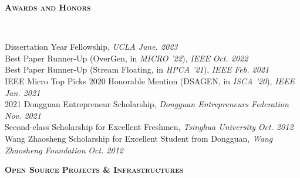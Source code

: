 \documentclass[a4paper]{article}
\newenvironment{changemargin}[2]{%
  \begin{list}{}{%
    \setlength{\topsep}{0pt}%
    \setlength{\leftmargin}{#1}%
    \setlength{\rightmargin}{#2}%
    \setlength{\listparindent}{\parindent}%
    \setlength{\itemindent}{\parindent}%
    \setlength{\parsep}{\parskip}%
  }%
  \item[]}{\end{list}
}
\newcommand{\lineover}{
	\begin{changemargin}{-0.05in}{-0.05in}
		\vspace*{-8pt}
		\hrulefill \\
		\vspace*{-2pt}
	\end{changemargin}
}
\newcommand{\header}[1]{
	\begin{changemargin}{-0.5in}{-0.5in}
		\scshape{\large \textbf{#1}}\\
  	\lineover
	\end{changemargin}
}
\newenvironment{body} {
	\vspace*{-16pt}
	\begin{changemargin}{-0.5in}{-0.5in}
  }	
	{\end{changemargin}
}
\begin{document}
\header{Awards and Honors}

\begin{body}
	\vspace{14pt}
	Dissertation Year Fellowship, \emph{UCLA} \hfill{} \emph{June. 2023}\\
	\smallskip
	Best Paper Runner-Up (OverGen, in \emph{MICRO '22}), \emph{IEEE} \hfill{} \emph{Oct. 2022}\\
	\smallskip
	Best Paper Runner-Up (Stream Floating, in \emph{HPCA '21}), \emph{IEEE} \hfill{} \emph{Feb. 2021}\\
	\smallskip
	IEEE Micro Top Picks 2020 Honorable Mention (DSAGEN, in \emph{ISCA '20}), \emph{IEEE} \hfill{} \emph{Jan. 2021}\\
	\smallskip
	2021 Dongguan Entrepreneur Scholarship, \emph{Dongguan Entrepreneurs Federation} \hfill{} \emph{Nov. 2021}\\
	\smallskip
	Second-class Scholarship for Excellent Freshmen, \emph{Tsinghua University} \hfill{} \emph{Oct. 2012}\\
	\smallskip
	Wang Zhaosheng Scholarship for Excellent Student from Dongguan, \emph{Wang Zhaosheng Foundation} \hfill{} \emph{Oct. 2012}\\
\end{body}

\smallskip
\smallskip

\header{Open Source Projects \& Infrastructures}
\end{document}
